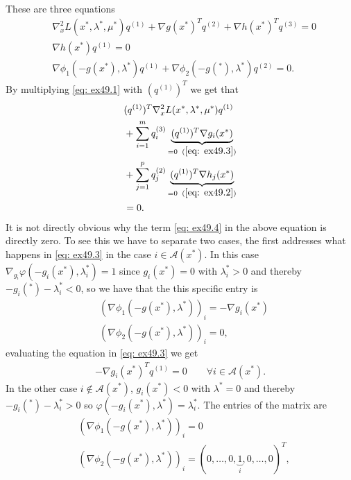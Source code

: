 These are three equations
\begin{align}
    &\nabla_x^{2}L(x^{*},\lambda^{*},\mu^{*})q^{(1)} + \nabla g(x^{*})^{T} q^{(2)}
    + \nabla h(x^{*})^{T}q^{(3)} = 0 \label{eq: ex49.1}\\
    &\nabla h(x^{*}) q^{(1)} = 0 \label{eq: ex49.2}\\
    &\nabla \phi_1(-g(x^{*}), \lambda^{*}) q^{(1)} + \nabla
    \phi_2(-g(^{*}),\lambda^{*}) q^{(2)} = 0 \label{eq: ex49.3}.
\end{align}
By multiplying \ref{eq: ex49.1} with $(q^{(1)})^{T}$ we get that
\begin{align}
    &(q^{(1)})^{T}\nabla_x^{2}L(x^{*},\lambda^{*},\mu^{*})q^{(1)}\\
    &+ \sum_{i=1}^{m} q_i^{(3)}\underbrace{(q^{(1)})^{T}\nabla
    g_i(x^{*})}_{=0 \;\; (\ref{eq: ex49.3})} \label{eq: ex49.4} \\
    &+ \sum_{j=1}^{p} q_j^{(2)}\underbrace{(q^{(1)})^{T}\nabla h_j(x^{*})}_{=0
    \;\; (\ref{eq: ex49.2})}\\
     &= 0. \nonumber
\end{align}
It is not directly obvious why the term \ref{eq: ex49.4} in the above
equation is directly zero. To see this we have to separate two cases, the first
addresses what happens in \ref{eq: ex49.3} in the case $i \in
\mathcal{A}(x^{*})$. In this case $\nabla_{g_i}\varphi(-g_i(x^{*}),
\lambda_i^{*}) = 1$ since $g_i(x^{*}) =0$ with $\lambda_i^{*}>0$ and thereby
$-g_i(^{*}) - \lambda_i^{*} < 0$, so we have that the this specific entry is
\begin{align}
    &\left(\nabla \phi_1(-g(x^{*}),\lambda^{*})\right)_i = -\nabla g_i(x^{*})\\
    &\left( \nabla \phi_2(-g(x^{*}),\lambda^{*})\right)_i = 0,
\end{align}
evaluating the equation in \ref{eq: ex49.3} we get
\begin{align}
    -\nabla g_i(x^{*})^{T}q^{(1)} = 0 \qquad \forall i\in\mathcal{A}(x^{*}).
\end{align}
In the other case $i \not\in \mathcal{A}(x^{*})$, $g_i(x^{*}) < 0$ with
$\lambda^{*} = 0$ and thereby $-g_i(^{*}) - \lambda_i^{*} >0$ so
$\varphi(-g_i(x^{*}),\lambda^{*}) = \lambda_i^{*}$. The entries of the matrix
are
\begin{align}
    &\left(\nabla \phi_1(-g(x^{*}),\lambda^{*})\right)_i = 0\\
    &\left( \nabla \phi_2(-g(x^{*}),\lambda^{*})\right)_i =
    (0,\ldots,0,\underbrace{1}_{i},0,\ldots,0)^{T},
\end{align}
